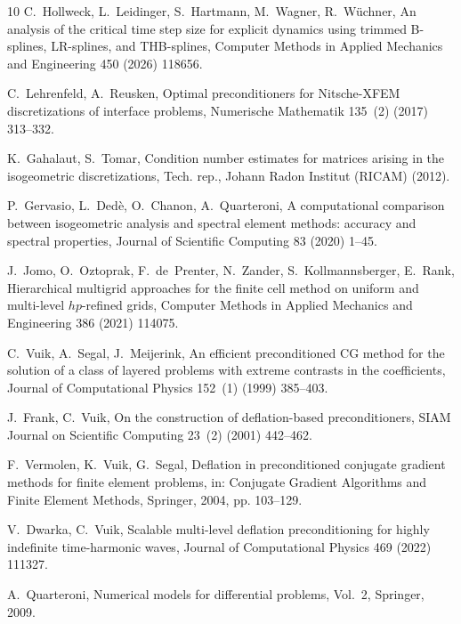 \documentclass{article}
\numberwithin{equation}{section}
\theoremstyle{definition}
\begin{document}
\begin{thebibliography}{10}
C.~Hollweck, L.~Leidinger, S.~Hartmann, M.~Wagner, R.~W{\"u}chner, An analysis of the critical time step size for explicit dynamics using trimmed {B}-splines, {LR}-splines, and {THB}-splines, Computer Methods in Applied Mechanics and Engineering 450 (2026) 118656.

C.~Lehrenfeld, A.~Reusken, Optimal preconditioners for {Nitsche}-{XFEM} discretizations of interface problems, Numerische Mathematik 135~(2) (2017) 313--332.

K.~Gahalaut, S.~Tomar, Condition number estimates for matrices arising in the isogeometric discretizations, Tech. rep., Johann Radon Institut (RICAM) (2012).

P.~Gervasio, L.~Ded{\`e}, O.~Chanon, A.~Quarteroni, A computational comparison between isogeometric analysis and spectral element methods: accuracy and spectral properties, Journal of Scientific Computing 83 (2020) 1--45.

J.~Jomo, O.~Oztoprak, F.~de~Prenter, N.~Zander, S.~Kollmannsberger, E.~Rank, Hierarchical multigrid approaches for the finite cell method on uniform and multi-level $hp$-refined grids, Computer Methods in Applied Mechanics and Engineering 386 (2021) 114075.

C.~Vuik, A.~Segal, J.~Meijerink, An efficient preconditioned {CG} method for the solution of a class of layered problems with extreme contrasts in the coefficients, Journal of Computational Physics 152~(1) (1999) 385--403.

J.~Frank, C.~Vuik, On the construction of deflation-based preconditioners, SIAM Journal on Scientific Computing 23~(2) (2001) 442--462.

F.~Vermolen, K.~Vuik, G.~Segal, Deflation in preconditioned conjugate gradient methods for finite element problems, in: Conjugate Gradient Algorithms and Finite Element Methods, Springer, 2004, pp. 103--129.

V.~Dwarka, C.~Vuik, Scalable multi-level deflation preconditioning for highly indefinite time-harmonic waves, Journal of Computational Physics 469 (2022) 111327.

A.~Quarteroni, Numerical models for differential problems, Vol.~2, Springer, 2009.


\end{thebibliography}
\end{document}
